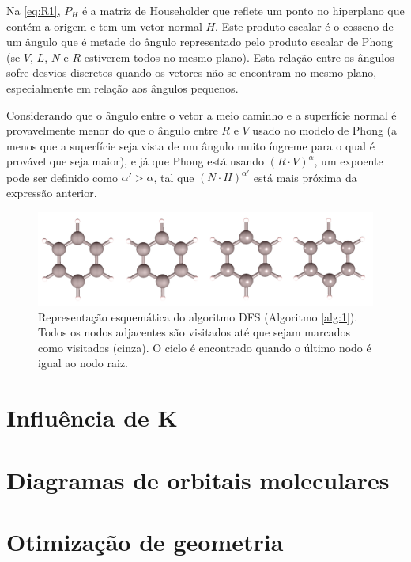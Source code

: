 Na \autoref{eq:R1}, $P_H$ é a matriz de Householder que reflete um ponto no hiperplano que contém a origem e tem um vetor normal $H$. Este produto escalar é o cosseno de um ângulo que é metade do ângulo representado pelo produto escalar de Phong (se $V$, $L$, $N$ e $R$ estiverem todos no mesmo plano). Esta relação entre os ângulos sofre desvios discretos quando os vetores não se encontram no mesmo plano, especialmente em relação aos ângulos pequenos.

Considerando que o ângulo entre o vetor a meio caminho e a superfície normal é provavelmente menor do que o ângulo entre $R$ e $V$ usado no modelo de Phong (a menos que a superfície seja vista de um ângulo muito íngreme para o qual é provável que seja maior), e já que Phong está usando $(R \cdot V)^\alpha$, um expoente pode ser definido como $\alpha' > \alpha$, tal que $(N \cdot H)^{\alpha'}$ está mais próxima da expressão anterior.

\begin{figure}[htb]
\caption{\label{fig:DFS} Representação esquemática do algoritmo DFS (Algoritmo \ref{alg:1}). Todos os nodos adjacentes são visitados até que sejam marcados como visitados (cinza). O ciclo é encontrado quando o último nodo é igual ao nodo raiz.}
	\begin{center}
		\includegraphics[width=1.0\textwidth]{images/shininess.png}
	\end{center}
\end{figure}

\section{Influência de K}

\section{Diagramas de orbitais moleculares}

\section{Otimização de geometria}

